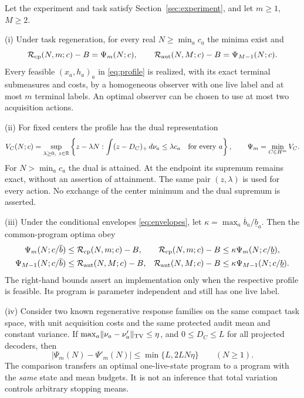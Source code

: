 \begin{theorem}\label{thm:central}
Let the experiment and task satisfy Section~\ref{sec:experiment}, and let $m\ge1$, $M\ge2$.

\textup{(i)} Under task regeneration, for every real $N\ge\min_a c_a$ the minima exist and
\begin{equation}\label{eq:exact}
 \mathcal R_{\mathrm{cp}}(N,m;c)-B=\Psi_m(N;c),\qquad
 \mathcal R_{\mathrm{aut}}(N,M;c)-B=\Psi_{M-1}(N;c).
\end{equation}
Every feasible $(x_a,h_a)_a$ in \eqref{eq:profile} is realized, with its exact terminal submeasures and costs, by a homogeneous observer with one live label and at most $m$ terminal labels. An optimal observer can be chosen to use at most two acquisition actions.

\textup{(ii)} For fixed centers the profile has the dual representation
\begin{equation}\label{eq:dual}
 V_C(N;c)=\sup_{\lambda\ge0,\ z\in\mathbb R}
 \left\{z-\lambda N:
       \int(z-D_C)_+\,d\nu_a\le\lambda c_a\quad\text{for every }a\right\},
 \qquad \Psi_m=\min_{C\in H^m}V_C.
\end{equation}
For $N>\min_a c_a$ the dual is attained. At the endpoint its supremum remains exact, without an assertion of attainment. The same pair $(z,\lambda)$ is used for every action. No exchange of the center minimum and the dual supremum is asserted.

\textup{(iii)} Under the conditional envelopes \eqref{eq:envelopes}, let $\kappa=\max_a\overline b_a/\underline b_a$. Then the common-program optima obey
\begin{align}
 \Psi_m(N;c/\overline b)&\le\mathcal R_{\mathrm{cp}}(N,m;c)-B,
 &\mathcal R_{\mathrm{cp}}(N,m;c)-B&\le\kappa\Psi_m(N;c/\underline b),\label{eq:cp-envelope}\\
 \Psi_{M-1}(N;c/\overline b)&\le\mathcal R_{\mathrm{aut}}(N,M;c)-B,
 &\mathcal R_{\mathrm{aut}}(N,M;c)-B&\le\kappa\Psi_{M-1}(N;c/\underline b).
 \label{eq:aut-envelope}
\end{align}
The right-hand bounds assert an implementation only when the respective profile is feasible. Its program is parameter independent and still has one live label.

\textup{(iv)} Consider two known regenerative response families on the same compact task space, with unit acquisition costs and the same protected audit mean and constant variance. If $\max_a\lVert\nu_a-\nu'_a\rVert_{\mathrm{TV}}\le\eta$, and $0\le D_C\le L$ for all projected decoders, then
\begin{equation}\label{eq:linear}
 |\Psi_m(N)-\Psi'_m(N)|\le\min\{L,2LN\eta\}\qquad(N\ge1).
\end{equation}
The comparison transfers an optimal one-live-state program to a program with the \emph{same} state and mean budgets. It is not an inference that total variation controls arbitrary stopping means.
\end{theorem}


